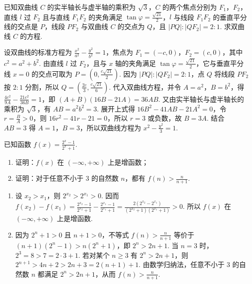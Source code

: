\documentclass[UTF8,a4paper,oneside,11pt]{ctexbook}
\begin{document}
\begin{problem}
已知双曲线 \(C\) 的实半轴长与虚半轴的乘积为 \(\sqrt{3}\)，\(C\) 的两个焦点分别为 \(F_1\)，\(F_2\)，直线 \(l\) 过 \(F_2\) 且与直线 \(F_1F_2\) 的夹角满足 \(\tan \varphi=\frac{\sqrt{21}}{2}\)，\(l\) 与线段 \(F_1F_2\) 的垂直平分线的交点是 \(P\)，线段 \(PF_2\) 与双曲线 \(C\) 的交点为 \(Q\)，且 \(|PQ|:|QF_2|=2:1\). 求双曲线 \(C\) 的方程.
\end{problem}

\begin{solution}
设双曲线的标准方程为 \(\frac{x^2}{a^2}-\frac{y^2}{b^2}=1\)，焦点为 \(F_1=(-c,0)\)，\(F_2=(c,0)\)，其中 \(c^2=a^2+b^2\). 由直线 \(l\) 过 \(F_2\)，且与 \(x\) 轴的夹角满足 \(\tan\varphi=\frac{\sqrt{21}}{2}\)，它与垂直平分线 \(x=0\) 的交点可取为 \(P=\left(0,\frac{c\sqrt{21}}{2}\right)\). 因为 \(|PQ|:|QF_2|=2:1\)，点 \(Q\) 将线段 \(PF_2\) 按 \(2:1\) 分割，所以 \(Q=\left(\frac{2c}{3},\frac{c\sqrt{21}}{6}\right)\). 代入双曲线方程，并令 \(A=a^2\)，\(B=b^2\)，得
\(\frac{4c^2}{9A}-\frac{21c^2}{36B}=1\)，即 \((A+B)(16B-21A)=36AB\). 又由实半轴长与虚半轴长的乘积为 \(\sqrt{3}\)，有 \(AB=a^2b^2=3\). 展开上式得 \(16B^2-41AB-21A^2=0\)，令 \(r=\frac{B}{A}>0\)，则 \(16r^2-41r-21=0\)，所以 \(r=3\) 或负数，故 \(B=3A\). 结合 \(AB=3\) 得 \(A=1\)，\(B=3\)，所以双曲线方程为 \(x^2-\frac{y^2}{3}=1\).
\end{solution}

\begin{problem}
已知函数 \(f(x)=\frac{2^x-1}{2^x+1}\).
\begin{enumerate}
\item 证明：\(f(x)\) 在 \((-\infty,+\infty)\) 上是增函数；
\item 证明：对于任意不小于 \(3\) 的自然数 \(n\)，都有 \(f(n)>\frac{n}{n+1}\).
\end{enumerate}

\begin{solution}
\begin{enumerate}
\item 设 \(x_2>x_1\)，则 \(2^{x_2}>2^{x_1}>0\). 因而
\(f(x_2)-f(x_1)=\frac{2^{x_2}-1}{2^{x_2}+1}-\frac{2^{x_1}-1}{2^{x_1}+1}=\frac{2\left(2^{x_2}-2^{x_1}\right)}{\left(2^{x_2}+1\right)\left(2^{x_1}+1\right)}>0\). 所以 \(f(x)\) 在 \((-\infty,+\infty)\) 上是增函数.
\item 因为 \(2^n+1>0\) 且 \(n+1>0\)，不等式 \(f(n)>\frac{n}{n+1}\) 等价于 \((n+1)(2^n-1)>n(2^n+1)\)，即 \(2^n>2n+1\). 当 \(n=3\) 时，\(2^3=8>7=2\cdot3+1\). 若对某个 \(n\geqslant3\) 有 \(2^n>2n+1\)，则 \(2^{n+1}>4n+2>2n+3=2(n+1)+1\). 由数学归纳法，任意不小于 \(3\) 的自然数 \(n\) 都满足 \(2^n>2n+1\)，从而 \(f(n)>\frac{n}{n+1}\).
\end{enumerate}
\end{solution}
\end{problem}

\end{document}
